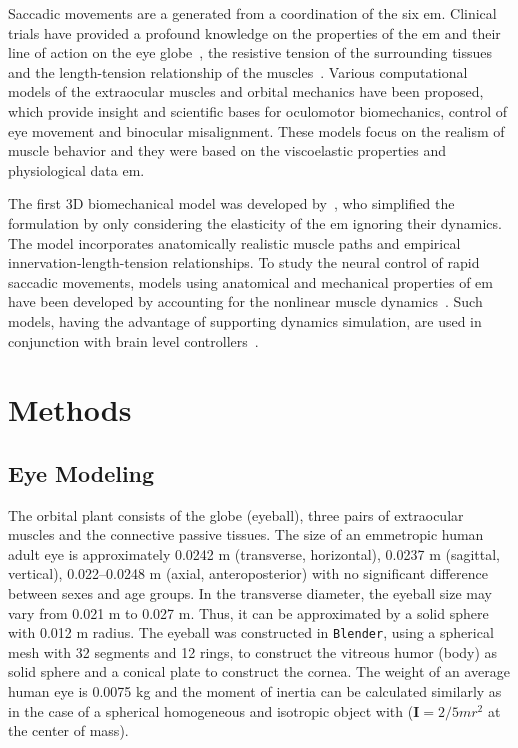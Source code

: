 \documentclass[11pt,a4paper,draft=false]{report}
\newcommand{\mat}[1]{\bm{#1}}
\begin{document}
Saccadic movements are a generated from a coordination of the six
\gls{em}. Clinical trials have provided a profound knowledge on the properties
of the \gls{em} and their line of action on the eye globe~\cite{Robinson1969a},
the resistive tension of the surrounding tissues~\cite{Collins1981} and the
length-tension relationship of the muscles~\cite{Iskander2018}. Various
computational models of the extraocular muscles and orbital mechanics have been
proposed, which provide insight and scientific bases for oculomotor
biomechanics, control of eye movement and binocular misalignment. These models
focus on the realism of muscle behavior and they were based on the viscoelastic
properties and physiological data \gls{em}.

The first 3D biomechanical model was developed by~\cite{Robinson1964a,
  Robinson1969}, who simplified the formulation by only considering the
elasticity of the \gls{em} ignoring their dynamics. The model incorporates
anatomically realistic muscle paths and empirical innervation-length-tension
relationships. To study the neural control of rapid saccadic movements, models
using anatomical and mechanical properties of \gls{em} have been developed by
accounting for the nonlinear muscle dynamics~\cite{Thelen2003a,
  Millard2013}. Such models, having the advantage of supporting dynamics
simulation, are used in conjunction with brain level
controllers~\cite{James2018}.

\section*{Methods}\label{sec:methods}

\subsection*{Eye Modeling}\label{sec:eye-Modeling}

The orbital plant consists of the globe (eyeball), three pairs of extraocular
muscles and the connective passive tissues. The size of an emmetropic human
adult eye is approximately 0.0242 m (transverse, horizontal), 0.0237 m
(sagittal, vertical), 0.022–0.0248 m (axial, anteroposterior) with no
significant difference between sexes and age groups. In the transverse diameter,
the eyeball size may vary from 0.021 m to 0.027 m. Thus, it can be approximated
by a solid sphere with 0.012 m radius. The eyeball was constructed in
\texttt{Blender}, using a spherical mesh with 32 segments and 12 rings, to
construct the vitreous humor (body) as solid sphere and a conical plate to
construct the cornea. The weight of an average human eye is 0.0075 kg and the
moment of inertia can be calculated similarly as in the case of a spherical
homogeneous and isotropic object with ($\mat{I} = 2/5 m r^2$ at the center of
mass).
\end{document}
